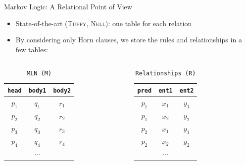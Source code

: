 \documentclass[onlymath,xcolor=pdftex,dvipsnames,table]{beamer}
\newcommand{\tuffy}{\textsc{Tuffy}\xspace}
\newcommand{\nell}{\textsc{Nell}\xspace}
\newcommand{\stt}[1]{\texttt{\small #1}\xspace}
\begin{document}
\begin{frame}{Markov Logic: A Relational Point of View}
\begin{itemize}
\item State-of-the-art (\tuffy, \nell): one table for each relation
\item By considering only Horn clauses, we store the rules and relationships in a few tables:
\end{itemize}
\vspace{-20pt}
\begin{columns}
    \begin{table}[h]
      \centering
      \caption{\stt{MLN (M)}}
      \begin{tabular}{ccc}\toprule
        \stt{head} & \stt{body1} & \stt{body2}\\\midrule
        $p_1$ & $q_1$ & $r_1$\\
        $p_2$ & $q_2$ & $r_2$\\
        $p_3$ & $q_3$ & $r_3$\\
        $p_4$ & $q_4$ & $r_4$\\
        & $\cdots$ &\\
        \bottomrule
      \end{tabular}
    \end{table}

    \begin{table}[h]
      \centering
      \caption{\stt{Relationships (R)}}
      \begin{tabular}{ccc}\toprule
        \stt{pred} & \stt{ent1} & \stt{ent2}\\\midrule
        $p_1$ & $x_1$ & $y_1$\\
        $p_1$ & $x_2$ & $y_2$\\
        $p_2$ & $x_1$ & $y_1$\\
        $p_2$ & $x_2$ & $y_2$\\
        & $\cdots$ &\\
        \bottomrule
      \end{tabular}
    \end{table}

\end{columns}
\end{frame}
\end{document}
